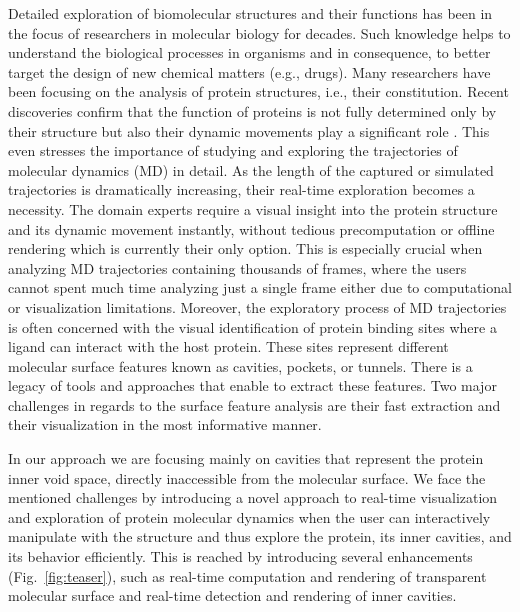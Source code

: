 
Detailed exploration of biomolecular structures and their functions has been in the focus of researchers in molecular biology for decades.
Such knowledge helps to understand the biological processes in organisms and in consequence, to better target the design of new chemical matters (e.g., drugs).
Many researchers have been focusing on the analysis of protein structures, i.e., their constitution. 
Recent discoveries confirm that the function of proteins is not fully determined only by their structure but also their dynamic movements play a significant role \cite{Hensen2012}.
This even stresses the importance of studying and exploring the trajectories of molecular dynamics (MD) in detail. 
As the length of the captured or simulated trajectories is dramatically increasing, their real-time exploration becomes a necessity. 
The domain experts require a visual insight into the protein structure and its dynamic movement instantly, without tedious precomputation or offline rendering which is currently their only option.
This is especially crucial when analyzing MD trajectories containing thousands of frames, where the users cannot spent much time analyzing just a single frame either due to computational or visualization limitations. 
Moreover, the exploratory process of MD trajectories is often concerned with the visual identification of protein binding sites where a ligand can interact with the host protein.
These sites represent different molecular surface features known as cavities, pockets, or tunnels.
There is a legacy of tools and approaches that enable to extract these features.
Two major challenges in regards to the surface feature analysis are their fast extraction and their visualization in the most informative manner. 

In our approach we are focusing mainly on cavities that represent the protein inner void space, directly inaccessible from the molecular surface. 
We face the mentioned challenges by introducing a novel approach to real-time visualization and exploration of protein molecular dynamics when the user can interactively manipulate with the structure and thus explore the protein, its inner cavities, and its behavior efficiently. 
This is reached by introducing several enhancements (Fig.~\ref{fig:teaser}), such as real-time computation and rendering of transparent molecular surface and real-time detection and rendering of inner cavities.


